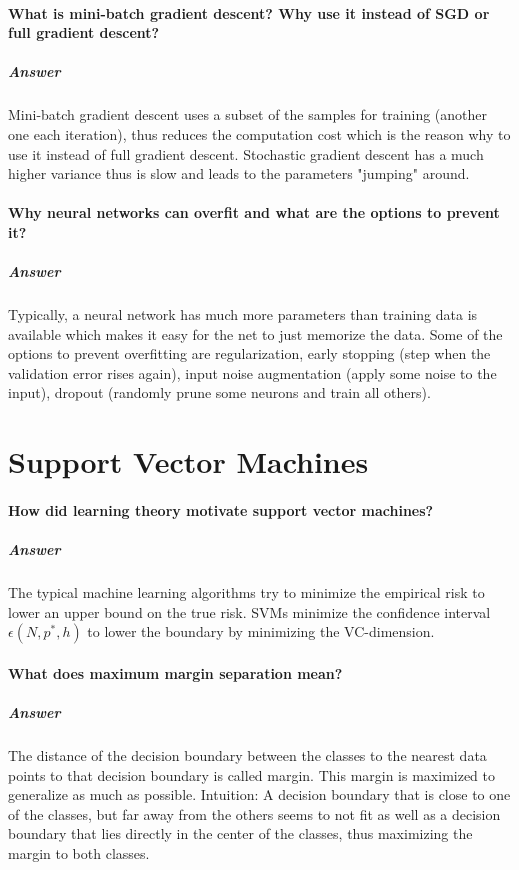 \documentclass[a4paper, 11pt, accentcolor = tud3b]{tudreport}
\newcommand{\answer}[1]{\subparagraph{Answer} #1}
\begin{document}
			\paragraph{What is mini-batch gradient descent? Why use it instead of SGD or full gradient descent?}
			\answer{Mini-batch gradient descent uses a subset of the samples for training (another one each iteration), thus reduces the computation cost which is the reason why to use it instead of full gradient descent. Stochastic gradient descent has a much higher variance thus is slow and leads to the parameters "jumping" around.}

			\paragraph{Why neural networks can overfit and what are the options to prevent it?}
			\answer{Typically, a neural network has much more parameters than training data is available which makes it easy for the net to just memorize the data. Some of the options to prevent overfitting are regularization, early stopping (step when the validation error rises again), input noise augmentation (apply some noise to the input), dropout (randomly prune some neurons and train all others).}

		\section{Support Vector Machines}
			\paragraph{How did learning theory motivate support vector machines?} %
			\answer{The typical machine learning algorithms try to minimize the empirical risk to lower an upper bound on the true risk. SVMs minimize the confidence interval \( \epsilon(N, p^\ast, h) \) to lower the boundary by minimizing the VC-dimension.}

			\paragraph{What does maximum margin separation mean?}
			\answer{The distance of the decision boundary between the classes to the nearest data points to that decision boundary is called margin. This margin is maximized to generalize as much as possible. Intuition: A decision boundary that is close to one of the classes, but far away from the others seems to not fit as well as a decision boundary that lies directly in the center of the classes, thus maximizing the margin to both classes.}
\end{document}
